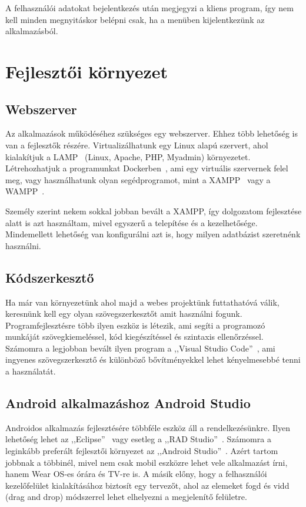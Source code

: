 \documentclass[
]{thesis-ekf}
\theoremstyle{definition}
\theoremstyle{remark}
\begin{document}
	A felhasználói adatokat bejelentkezés után megjegyzi a kliens program, így nem kell minden megnyitáskor belépni csak, ha a menüben kijelentkezünk az alkalmazásból. 
	
	\chapter{Fejlesztői környezet}
	\section{Webszerver}
	Az alkalmazások működéséhez szükséges egy webszerver. Ehhez több lehetőség is van a fejlesztők részére. Virtualizálhatunk egy Linux alapú szervert, ahol kialakítjuk a LAMP~\cite{lamp_book} (Linux, Apache, PHP, Myadmin) környezetet. Létrehozhatjuk a programunkat Dockerben~\cite{docker_doc}, ami egy virtuális szervernek felel meg, vagy használhatunk olyan segédprogramot, mint a XAMPP~\cite{xampp_doc} vagy a WAMPP~\cite{wamp_doc}. 
	
	Személy szerint nekem sokkal jobban bevált a XAMPP, így dolgozatom fejlesztése alatt is azt használtam, mivel egyszerű a telepítése és a kezelhetősége. Mindemellett lehetőség van konfigurálni azt is, hogy milyen adatbázist szeretnénk használni. 
	
	\section{Kódszerkesztő}
	Ha már van környezetünk ahol majd a webes projektünk futtathatóvá válik, keresnünk kell egy olyan szövegszerkesztőt amit használni fogunk. Programfejlesztésre több ilyen eszköz is létezik, ami segíti a programozó munkáját szövegkiemeléssel, kód kiegészítéssel és szintaxis ellenőrzéssel. Számomra a legjobban bevált ilyen program a ,,Visual Studio Code''~\cite{vsc_doc}, ami ingyenes szövegszerkesztő és különböző bővítményekkel lehet kényelmesebbé tenni a használatát.
	
	\section{Android alkalmazáshoz Android Studio}
	Androidos alkalmazás fejlesztésére többféle eszköz áll a rendelkezésünkre. Ilyen lehetőség lehet az ,,Eclipse''~\cite{eclipse_doc} vagy esetleg a ,,RAD Studio''~\cite{rad_doc}. Számomra a leginkább preferált fejlesztői környezet az ,,Android Studio''~\cite{androidStudio_doc}. Azért tartom jobbnak a többinél, mivel nem csak mobil eszközre lehet vele alkalmazást írni, hanem Wear OS-es órára és TV-re is. A másik előny, hogy a felhasználói kezelőfelület kialakításához biztosít egy tervezőt, ahol az elemeket fogd és vidd (drag and drop) módszerrel lehet elhelyezni a megjelenítő felületre. 
	
\end{document}
